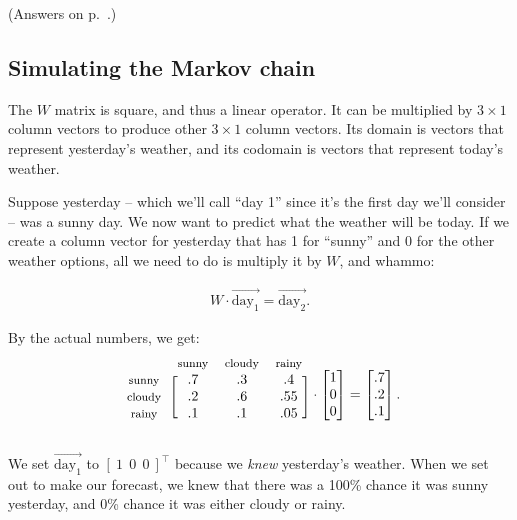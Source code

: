 \begin{alttitles}
(Answers on p.~\pageref{markovPuzzleSol}.)

\subsection{Simulating the Markov chain}


The $W$ matrix is square, and thus a linear operator. It can be multiplied by
$3\times 1$ column vectors to produce other $3\times 1$ column vectors. Its
domain is vectors that represent yesterday's weather, and its codomain is
vectors that represent today's weather.

Suppose yesterday -- which we'll call ``day 1'' since it's the first day we'll
consider -- was a sunny day. We now want to predict what the weather will be
today. If we create a column vector for yesterday that has 1 for ``sunny'' and
0 for the other weather options, all we need to do is multiply it by $W$, and
whammo:

\vspace{-.15in}
\begin{align*}
W \cdot \overrightarrow{\textrm{day}_1} = \overrightarrow{\textrm{day}_2}.
\end{align*}
\vspace{-.15in}

By the actual numbers, we get:
\[
\begin{blockarray}{cccccc}
& {\footnotesize\textrm{sunny}} & {\footnotesize\textrm{cloudy}} &
{\footnotesize\textrm{rainy}} \\
\begin{block}{c[ccccc]}
{\footnotesize\textrm{sunny}} & .7 & .3 & .4 \\
{\footnotesize\textrm{cloudy}} & .2 & .6 & .55 \\
{\footnotesize\textrm{rainy}} & .1 & .1 & .05 \\
\end{block}
\end{blockarray} \cdot
\begin{bmatrix}
1 \\ 0 \\ 0 \\
\end{bmatrix} =
\begin{bmatrix}
.7 \\ .2 \\ .1
\end{bmatrix}.
\]

We set $\overrightarrow{\textrm{day}_1}$ to $[\ 1\ \ 0\ \ 0\ ]^\intercal$
because we \textit{knew} yesterday's weather. When we set out to make our
forecast, we knew that there was a 100\% chance it was sunny yesterday, and 0\%
chance it was either cloudy or rainy.


\end{alttitles}

